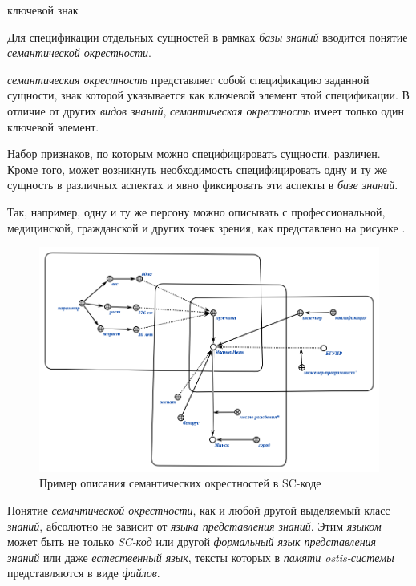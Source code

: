 \begin{SCn}
	\begin{scnrelfromlist}{ключевой знак}
	\end{scnrelfromlist}
\end{SCn}

Для спецификации отдельных сущностей в рамках \textit{базы знаний} вводится понятие \textit{семантической окрестности}. 

\textit{семантическая окрестность} представляет собой спецификацию заданной сущности, знак которой указывается как ключевой элемент этой спецификации. В отличие от других \textit{видов знаний}, \textit{семантическая окрестность} имеет только один ключевой элемент.

Набор признаков, по которым можно специфицировать сущности, различен. Кроме того, может возникнуть необходимость специфицировать одну и ту же сущность в различных аспектах и явно фиксировать эти аспекты в \textit{базе знаний}.

Так, например, одну и ту же персону можно описывать с профессиональной, медицинской, гражданской и других точек зрения, как представлено на рисунке \textit{}. 

\begin{figure}[H]
	\includegraphics[scale=0.7]{author/part2/figures/chapter_kb/semantic_neighborhood.png}
	\caption{Пример описания семантических окрестностей в SC-коде}
	\label{fig:semantic_neighborhood}
\end{figure}

Понятие \textit{семантической окрестности}, как и любой другой  выделяемый класс \textit{знаний}, абсолютно не зависит от \textit{языка представления знаний}. Этим \textit{языком} может быть не только \textit{SC-код} или другой \textit{формальный язык представления знаний} или даже \textit{естественный язык}, тексты которых в \textit{памяти ostis-системы} представляются в виде \textit{файлов}.

